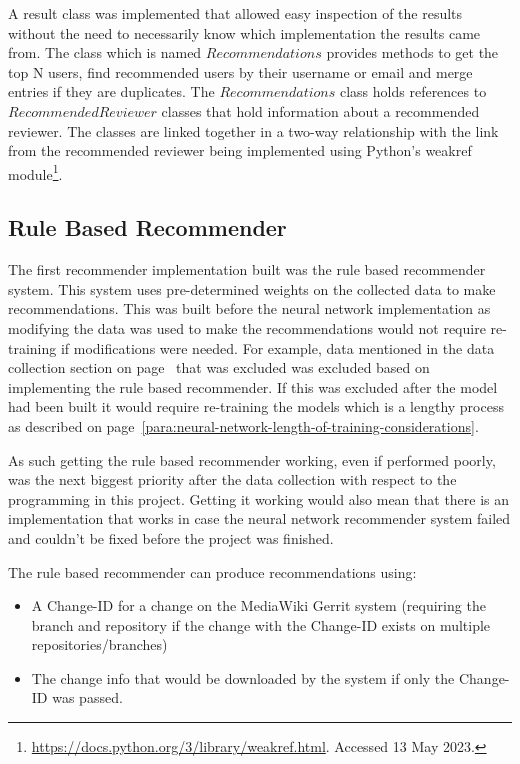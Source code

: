 A result class was implemented that allowed easy inspection of the results without the need to necessarily know which implementation the results came from. The class which is named $Recommendations$ provides methods to get the top N users, find recommended users by their username or email and merge entries if they are duplicates. The $Recommendations$ class holds references to $RecommendedReviewer$ classes that hold information about a recommended reviewer. The classes are linked together in a two-way relationship with the link from the recommended reviewer being implemented using Python's weakref module\footnote{\url{https://docs.python.org/3/library/weakref.html}. Accessed 13 May 2023.}.

\subsection{Rule Based Recommender\label{section:rule-based-implementation}}

The first recommender implementation built was the rule based recommender system. This system uses pre-determined weights on the collected data to make recommendations. This was built before the neural network implementation as modifying the data was used to make the recommendations would not require re-training if modifications were needed. For example, data mentioned in the data collection section on page~\pageref{para:data-inspected-but-not-used} that was excluded was excluded based on implementing the rule based recommender. If this was excluded after the model had been built it would require re-training the models which is a lengthy process as described on page~\ref{para:neural-network-length-of-training-considerations}.

As such getting the rule based recommender working, even if performed poorly, was the next biggest priority after the data collection with respect to the programming in this project. Getting it working would also mean that there is an implementation that works in case the neural network recommender system failed and couldn't be fixed before the project was finished.

The rule based recommender can produce recommendations using:
\begin{itemize}
    \item A Change-ID for a change on the MediaWiki Gerrit system (requiring the branch and repository if the change with the Change-ID exists on multiple repositories/branches)
    \item The change info that would be downloaded by the system if only the Change-ID was passed.
\end{itemize}


